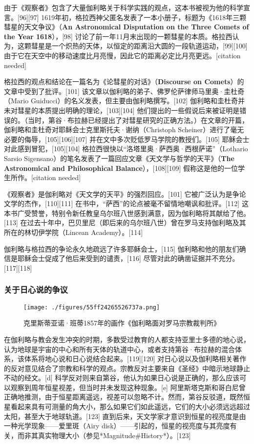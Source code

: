 由于《观察者》包含了大量伽利略关于科学实践的观点，这本书被视为他的科学宣言。[96][97] 1619年初，格拉西神父匿名发表了一本小册子，标题为《1618年三颗彗星的天文争议》（\textbf{An Astronomical Disputation on the Three Comets of the Year 1618}），[98] 讨论了前一年11月末出现的一颗彗星的本质。格拉西认为，这颗彗星是一个炽热的天体，以恒定的距离沿大圆的一段轨道运动，[99][100] 由于它在天空中的移动速度比月亮慢，因此它的距离必定比月亮更远。[citation needed]  

格拉西的观点和结论在一篇名为《论彗星的对话》（\textbf{Discourse on Comets}）的文章中受到了批评。[101] 该文章以伽利略的弟子、佛罗伦萨律师马里奥·圭杜奇（Mario Guiducci）的名义发表，但主要由伽利略撰写。[102] 伽利略和圭杜奇并未对彗星的本质提出明确的理论，[103][104] 他们提出的一些假说后来被证明是错误的。（当时，第谷·布拉赫已经提出了对彗星研究的正确方法。）在文章的开篇，伽利略和圭杜奇对耶稣会士克里斯托夫·谢纳（Christoph Scheiner）进行了毫无必要的侮辱，[105][106][107] 并在文中多次贬低罗马学院的教授们。[105] 耶稣会士对此感到冒犯，[105][104] 格拉西很快以“洛塔里奥·萨西奥·西根萨诺”（Lothario Sarsio Sigensano）的笔名发表了一篇回应文章《天文学与哲学的天平》（\textbf{The Astronomical and Philosophical Balance}），[108][109] 假称这是他的一位学生所作。[citation needed]  

《观察者》是伽利略对《天文学的天平》的强烈回应。[101] 它被广泛认为是争论文学的杰作，[110][111] 在书中，“萨西”的论点被毫不留情地嘲讽和批评。[112] 这本书广受赞誉，特别令新任教皇乌尔班八世感到满意，因为伽利略将其献给了他。[113] 在过去十年中，巴贝里尼（即后来的乌尔班八世）曾在罗马支持伽利略及其所在的林切伊学院（Lincean Academy）。[114]  

伽利略与格拉西的争论永久地疏远了许多耶稣会士，[115] 伽利略和他的朋友们确信是耶稣会士促成了他后来受到的谴责，[116] 尽管对此的确凿证据并不充分。[117][118]
\subsubsection{关于日心说的争议}
\begin{figure}[ht]
\centering
\texttt{[image: ./figures/55ff24265526737a.png]}
\caption{克里斯蒂亚诺·班蒂1857年的画作《伽利略面对罗马宗教裁判所》} \label{fig_JLL_8}
\end{figure}
在伽利略与教会发生冲突的时期，多数受过教育的人都支持亚里士多德的地心说，认为地球是宇宙的中心和所有天体的轨道中心，或者支持第谷·布拉赫的混合体系，该体系将地心说和日心说结合起来。[119][120] 对日心说以及伽利略相关著作的反对意见结合了宗教和科学的观点。宗教反对主要来自《圣经》中暗示地球静止不动的经文。[d] 科学反对则来自第谷，他认为如果日心说是正确的，那么应该可以观察到周年恒星视差，但当时并未发现这种现象。[e] 阿里斯塔克斯和哥白尼曾正确地推测，由于恒星距离遥远，视差可以忽略不计。然而，第谷反驳道，既然恒星看起来具有可测量的角大小，那么如果它们如此遥远，它们的大小必须远远超过太阳，甚至大于地球轨道。[123] 直到后来，天文学家才意识到恒星的视亮度是由一种光学现象——爱里斑（Airy disk）——引起的，恒星的视亮度与其亮度有关，而非其真实物理大小（参见*Magnitude#History*）。[123]  

